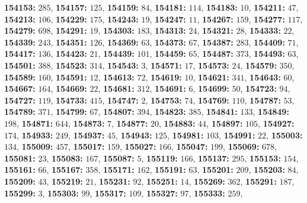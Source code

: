\textsf{\bfseries 154153:} $285$, \textsf{\bfseries 154157:} $125$, \textsf{\bfseries 154159:} $84$, \textsf{\bfseries 154181:} $114$, \textsf{\bfseries 154183:} $10$, \textsf{\bfseries 154211:} $47$, \textsf{\bfseries 154213:} $106$, \textsf{\bfseries 154229:} $175$, \textsf{\bfseries 154243:} $19$, \textsf{\bfseries 154247:} $11$, \textsf{\bfseries 154267:} $159$, \textsf{\bfseries 154277:} $117$, \textsf{\bfseries 154279:} $698$, \textsf{\bfseries 154291:} $19$, \textsf{\bfseries 154303:} $183$, \textsf{\bfseries 154313:} $24$, \textsf{\bfseries 154321:} $28$, \textsf{\bfseries 154333:} $22$, \textsf{\bfseries 154339:} $243$, \textsf{\bfseries 154351:} $126$, \textsf{\bfseries 154369:} $63$, \textsf{\bfseries 154373:} $67$, \textsf{\bfseries 154387:} $283$, \textsf{\bfseries 154409:} $71$, \textsf{\bfseries 154417:} $136$, \textsf{\bfseries 154423:} $21$, \textsf{\bfseries 154439:} $101$, \textsf{\bfseries 154459:} $65$, \textsf{\bfseries 154487:} $373$, \textsf{\bfseries 154493:} $63$, \textsf{\bfseries 154501:} $388$, \textsf{\bfseries 154523:} $314$, \textsf{\bfseries 154543:} $3$, \textsf{\bfseries 154571:} $17$, \textsf{\bfseries 154573:} $24$, \textsf{\bfseries 154579:} $350$, \textsf{\bfseries 154589:} $160$, \textsf{\bfseries 154591:} $12$, \textsf{\bfseries 154613:} $72$, \textsf{\bfseries 154619:} $10$, \textsf{\bfseries 154621:} $341$, \textsf{\bfseries 154643:} $60$, \textsf{\bfseries 154667:} $164$, \textsf{\bfseries 154669:} $22$, \textsf{\bfseries 154681:} $312$, \textsf{\bfseries 154691:} $6$, \textsf{\bfseries 154699:} $50$, \textsf{\bfseries 154723:} $94$, \textsf{\bfseries 154727:} $119$, \textsf{\bfseries 154733:} $415$, \textsf{\bfseries 154747:} $2$, \textsf{\bfseries 154753:} $74$, \textsf{\bfseries 154769:} $110$, \textsf{\bfseries 154787:} $53$, \textsf{\bfseries 154789:} $371$, \textsf{\bfseries 154799:} $67$, \textsf{\bfseries 154807:} $394$, \textsf{\bfseries 154823:} $385$, \textsf{\bfseries 154841:} $133$, \textsf{\bfseries 154849:} $198$, \textsf{\bfseries 154871:} $644$, \textsf{\bfseries 154873:} $7$, \textsf{\bfseries 154877:} $20$, \textsf{\bfseries 154883:} $44$, \textsf{\bfseries 154897:} $105$, \textsf{\bfseries 154927:} $174$, \textsf{\bfseries 154933:} $249$, \textsf{\bfseries 154937:} $45$, \textsf{\bfseries 154943:} $125$, \textsf{\bfseries 154981:} $103$, \textsf{\bfseries 154991:} $22$, \textsf{\bfseries 155003:} $134$, \textsf{\bfseries 155009:} $457$, \textsf{\bfseries 155017:} $159$, \textsf{\bfseries 155027:} $166$, \textsf{\bfseries 155047:} $199$, \textsf{\bfseries 155069:} $678$, \textsf{\bfseries 155081:} $23$, \textsf{\bfseries 155083:} $167$, \textsf{\bfseries 155087:} $5$, \textsf{\bfseries 155119:} $166$, \textsf{\bfseries 155137:} $295$, \textsf{\bfseries 155153:} $154$, \textsf{\bfseries 155161:} $66$, \textsf{\bfseries 155167:} $358$, \textsf{\bfseries 155171:} $162$, \textsf{\bfseries 155191:} $63$, \textsf{\bfseries 155201:} $209$, \textsf{\bfseries 155203:} $84$, \textsf{\bfseries 155209:} $43$, \textsf{\bfseries 155219:} $21$, \textsf{\bfseries 155231:} $92$, \textsf{\bfseries 155251:} $14$, \textsf{\bfseries 155269:} $362$, \textsf{\bfseries 155291:} $187$, \textsf{\bfseries 155299:} $3$, \textsf{\bfseries 155303:} $99$, \textsf{\bfseries 155317:} $109$, \textsf{\bfseries 155327:} $97$, \textsf{\bfseries 155333:} $259$, 
